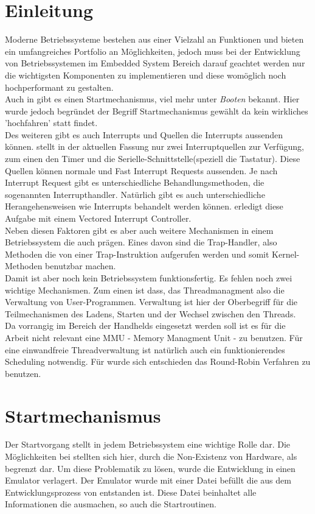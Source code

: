 \section{Einleitung}
Moderne Betriebssysteme bestehen aus einer Vielzahl an Funktionen und bieten ein umfangreiches Portfolio an M\"oglichkeiten, jedoch muss bei der Entwicklung von Betriebssystemen im Embedded System Bereich darauf geachtet werden nur die wichtigsten Komponenten zu implementieren und diese wom\"oglich noch hochperformant zu gestalten.\\
Auch in \mops gibt es einen Startmechanismus, viel mehr unter \textit{Booten} bekannt. Hier wurde jedoch begr\"undet der Begriff Startmechanismus gew\"ahlt da kein wirkliches 'hochfahren' statt findet.\\
Des weiteren gibt es auch Interrupts und Quellen die Interrupts aussenden k\"onnen. \mops stellt in der aktuellen Fassung nur zwei Interruptquellen zur Verf\"ugung, zum einen den Timer und die Serielle-Schnittstelle(speziell die Tastatur). Diese Quellen k\"onnen normale und Fast Interrupt Requests aussenden. Je nach Interrupt Request gibt es unterschiedliche Behandlungsmethoden, die sogenannten Interrupthandler. Nat\"urlich gibt es auch unterschiedliche Herangehensweisen wie Interrupts behandelt werden k\"onnen. \mops erledigt diese Aufgabe mit einem Vectored Interrupt Controller.\\
Neben diesen Faktoren gibt es aber auch weitere Mechanismen in einem Betriebssystem die auch \mops pr\"agen. Eines davon sind die Trap-Handler, also Methoden die von einer Trap-Instruktion aufgerufen werden und somit Kernel-Methoden benutzbar machen.\\
Damit ist aber noch kein Betriebssystem funktionsfertig. Es fehlen noch zwei wichtige Mechanismen. Zum einen ist dass, das Threadmanagment also die Verwaltung von User-Programmen. Verwaltung ist hier der Oberbegriff f\"ur die Teilmechanismen des Ladens, Starten und der Wechsel zwischen den Threads.\\
Da \mops vorrangig im Bereich der Handhelds eingesetzt werden soll ist es f\"ur die Arbeit nicht relevant eine MMU - Memory Managment Unit - zu benutzen. F\"ur eine einwandfreie Threadverwaltung ist nat\"urlich auch ein funktionierendes Scheduling notwendig. F\"ur \mops wurde sich entschieden das Round-Robin Verfahren zu benutzen.
\section{Startmechanismus}
Der Startvorgang stellt in jedem Betriebssystem eine wichtige Rolle dar. Die M\"oglichkeiten bei \mops stellten sich hier, durch die Non-Existenz von Hardware, als begrenzt dar. Um diese Problematik zu l\"osen, wurde die Entwicklung in einen Emulator verlagert. Der Emulator wurde mit einer Datei bef\"ullt die aus dem Entwicklungsprozess von \mops entstanden ist. Diese Datei beinhaltet alle Informationen die \mops ausmachen, so auch die Startroutinen.

